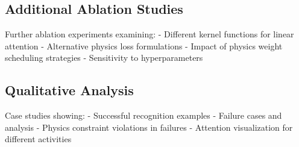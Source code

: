 \documentclass[10pt,journal,compsoc]{IEEEtran}
\begin{document}
\subsection{Additional Ablation Studies}

Further ablation experiments examining:
- Different kernel functions for linear attention
- Alternative physics loss formulations  
- Impact of physics weight scheduling strategies
- Sensitivity to hyperparameters

\subsection{Qualitative Analysis}

Case studies showing:
- Successful recognition examples
- Failure cases and analysis
- Physics constraint violations in failures
- Attention visualization for different activities
\end{document}
